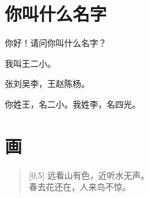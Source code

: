 \documentclass[12pt,UTF-8,openany]{ctexbook}
\begin{document}
\hanzibox{}\hanzibox{}\hanzibox{}\hanzibox{}\hspace{1em}\hanzibox{}\hanzibox{}\hanzibox{}\hanzibox{}

\hanzibox{}\hanzibox{}\hanzibox{}\hanzibox{}\hspace{1em}\hanzibox{}\hanzibox{}\hanzibox{}\hanzibox{}






\chapter{你叫什么名字}

\begin{large}
    
    你好！请问你叫什么名字？
    
    我叫王二小。
    
    张刘吴李，王赵陈杨。
    
    你姓王，名二小。我姓李，名四光。
    
\end{large}


\clearpage

\begin{center}
    
    
\end{center}


\hanzibox{}\hanzibox{}\hanzibox{}\hanzibox{}\hspace{1em}\hanzibox{}\hanzibox{}\hanzibox{}\hanzibox{}

\hanzibox{}\hanzibox{}\hanzibox{}\hanzibox{}\hspace{1em}\hanzibox{}\hanzibox{}\hanzibox{}\hanzibox{}

\hanzibox{}\hanzibox{}\hanzibox{}\hanzibox{}\hspace{1em}




\chapter{画}

\begin{large}
    
    \begin{verse}[0.5\linewidth]
        远看山有色，近听水无声。 \\
        春去花还在，人来鸟不惊。
    \end{verse}
    
\end{large}
\end{document}
